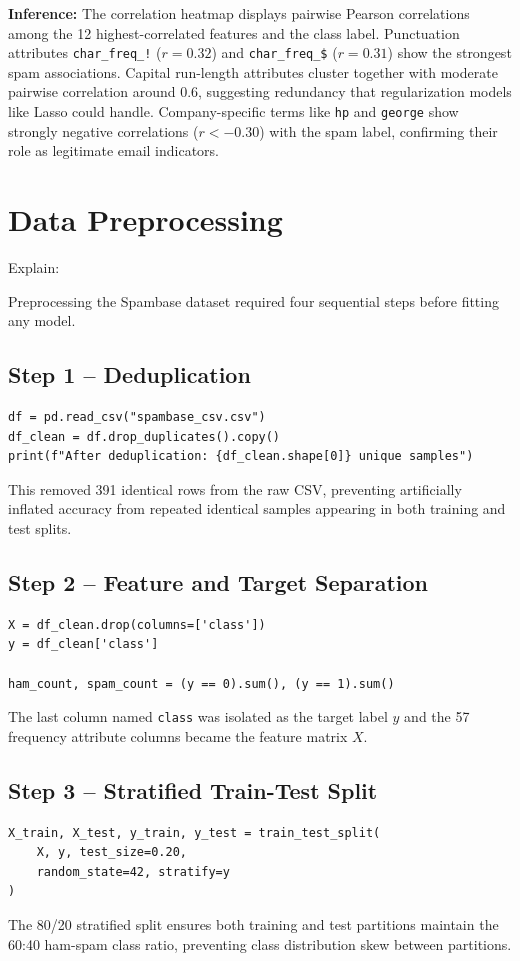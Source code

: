 \documentclass[12pt,a4paper]{article}
\begin{document}
\textbf{Inference:}
The correlation heatmap displays pairwise Pearson correlations among the 12 highest-correlated features and the class label. Punctuation attributes \texttt{char\_freq\_!} ($r=0.32$) and \texttt{char\_freq\_\$} ($r=0.31$) show the strongest spam associations. Capital run-length attributes cluster together with moderate pairwise correlation around 0.6, suggesting redundancy that regularization models like Lasso could handle. Company-specific terms like \texttt{hp} and \texttt{george} show strongly negative correlations ($r < -0.30$) with the spam label, confirming their role as legitimate email indicators.

\section{Data Preprocessing}

Explain:

Preprocessing the Spambase dataset required four sequential steps before fitting any model.

\subsection*{Step 1 -- Deduplication}
\begin{lstlisting}
df = pd.read_csv("spambase_csv.csv")
df_clean = df.drop_duplicates().copy()
print(f"After deduplication: {df_clean.shape[0]} unique samples")
\end{lstlisting}
This removed 391 identical rows from the raw CSV, preventing artificially inflated accuracy from repeated identical samples appearing in both training and test splits.

\subsection*{Step 2 -- Feature and Target Separation}
\begin{lstlisting}
X = df_clean.drop(columns=['class'])
y = df_clean['class']

ham_count, spam_count = (y == 0).sum(), (y == 1).sum()
\end{lstlisting}
The last column named \texttt{class} was isolated as the target label $y$ and the 57 frequency attribute columns became the feature matrix $X$.

\subsection*{Step 3 -- Stratified Train-Test Split}
\begin{lstlisting}
X_train, X_test, y_train, y_test = train_test_split(
    X, y, test_size=0.20,
    random_state=42, stratify=y
)
\end{lstlisting}
The 80/20 stratified split ensures both training and test partitions maintain the 60:40 ham-spam class ratio, preventing class distribution skew between partitions.
\end{document}
